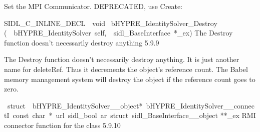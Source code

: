 \documentclass{article}
\begin{document}
\begin{cxxentry}
\begin{cxxentry}
\begin{cxxfunction}
\begin{cxxdoc}
Set the MPI Communicator.
DEPRECATED, use Create:
\end{cxxdoc}
\end{cxxfunction}
\begin{cxxfunction}
{SIDL\_C\_INLINE\_DECL\ \ void\ }
        {bHYPRE\_IdentitySolver\_Destroy}
        {(\ \ bHYPRE\_IdentitySolver\ self,\ \ sidl\_BaseInterface\ *\_ex)}
        {
The Destroy function doesn't necessarily destroy anything}
        {5.9.9}
\begin{cxxdoc}

The Destroy function doesn't necessarily destroy anything.
It is just another name for deleteRef.  Thus it decrements the
object's reference count.  The Babel memory management system will
destroy the object if the reference count goes to zero.
\end{cxxdoc}
\end{cxxfunction}
\begin{cxxvariable}
{\ struct\ \ bHYPRE\_IdentitySolver\_\_object*\ bHYPRE\_IdentitySolver\_\_connectI\ const\ char\ *\ url\ sidl\_bool\ ar\ struct\ sidl\_BaseInterface\_\_object}
        {**\_ex}
        {}
        {
RMI connector function for the class}
        {5.9.10}
\begin{cxxdoc}


\end{cxxdoc}
\end{cxxvariable}
\end{cxxentry}
\end{cxxentry}
\end{document}
